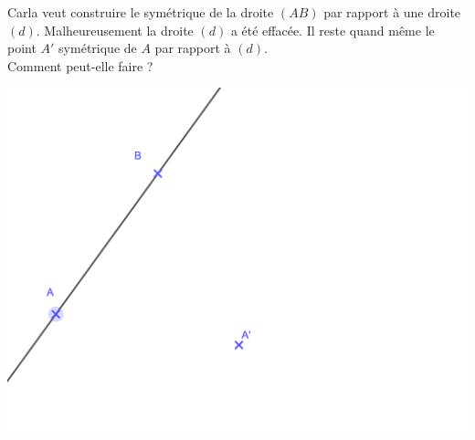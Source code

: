 \documentclass[12pt,a4paper]{article}
\date{}
\title{}
\begin{document}




\begin{myact}
	\noindent Carla veut construire le symétrique de la droite $(AB)$ par rapport à une droite $(d)$. 
	Malheureusement la droite $(d)$ a été effacée. Il reste quand même le point $A'$ symétrique de $A$ par rapport à $(d)$.\\
	
	\noindent Comment peut-elle faire ?
	
	\begin{center}
		\includegraphics[scale=0.22]{act1}
	\end{center}
\end{myact}
\end{document}
